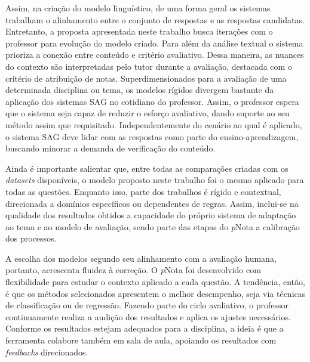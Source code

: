 Assim, na criação do modelo linguístico, de uma forma geral os sistemas trabalham o alinhamento entre o conjunto de respostas e as respostas candidatas. Entretanto, a proposta apresentada neste trabalho busca iterações com o professor para evolução do modelo criado. Para além da análise textual o sistema prioriza a conexão entre conteúdo e critério avaliativo. Dessa maneira, as nuances do contexto são interpretadas pelo tutor durante a avaliação, destacada com o critério de atribuição de notas. Superdimensionados para a avaliação de uma determinada disciplina ou tema, os modelos rígidos divergem bastante da aplicação dos sistemas SAG no cotidiano do professor. Assim, o professor espera que o sistema seja capaz de reduzir o esforço avaliativo, dando suporte ao seu método assim que requisitado. Independentemente do cenário ao qual é aplicado, o sistema SAG deve lidar com as respostas como parte do ensino-aprendizagem, buscando minorar a demanda de verificação do conteúdo.

Ainda é importante salientar que, entre todas as comparações criadas com os \textit{datasets} disponíveis, o modelo proposto neste trabalho foi o mesmo aplicado para todas as questões. Enquanto isso, parte dos trabalhos é rígido e contextual, direcionada a domínios específicos ou dependentes de regras. Assim, inclui-se na qualidade dos resultados obtidos a capacidade do próprio sistema de adaptação ao tema e ao modelo de avaliação, sendo parte das etapas do \textit{p}Nota a calibração dos processos.

A escolha dos modelos segundo seu alinhamento com a avaliação humana, portanto, acrescenta fluidez à correção. O \textit{p}Nota foi desenvolvido com flexibilidade para estudar o contexto aplicado a cada questão. A tendência, então, é que os métodos selecionados apresentem o melhor desempenho, seja via técnicas de classificação ou de regressão. Fazendo parte do ciclo avaliativo, o professor continuamente realiza a audição dos resultados e aplica os ajustes necessários. Conforme os resultados estejam adequados para a disciplina, a ideia é que a ferramenta colabore também em sala de aula, apoiando os resultados com \textit{feedbacks} direcionados.